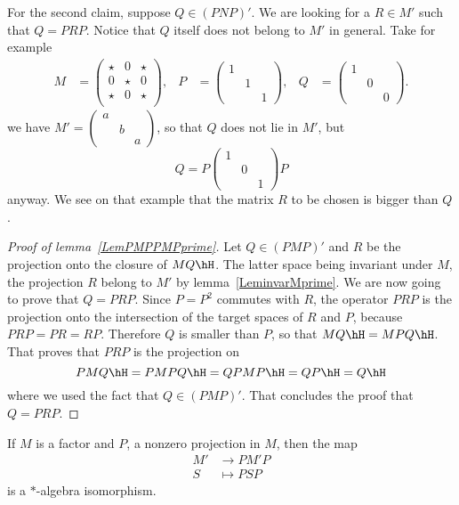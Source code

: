 For the second claim, suppose $Q\in(PNP)'$. We are looking for a $R\in M'$ such that $Q=PRP$. Notice that $Q$ itself does not belong to $M'$ in general. Take for example
\begin{align*}
	M & =\begin{pmatrix}
		     \star & 0     & \star \\
		     0     & \star & 0     \\
		     \star & 0     & \star \\
	     \end{pmatrix},
	  &
	P & =\begin{pmatrix}
		     1        \\
		      & 1     \\
		      &   & 1
	     \end{pmatrix},
	  &
	Q & =\begin{pmatrix}
		     1        \\
		      & 0     \\
		      &   & 0
	     \end{pmatrix}.
\end{align*}
we have $M'=\begin{pmatrix}
		a        \\
		 & b     \\
		 &   & a
	\end{pmatrix}$, so that $Q$ does not lie in $M'$, but
\[
	Q=P\begin{pmatrix}
		1        \\
		 & 0     \\
		 &   & 1
	\end{pmatrix}P
\]
anyway. We see on that example that the matrix $R$ to be chosen is bigger than $Q$.

\begin{proof}[Proof of lemma~\ref{LemPMPPMPprime}]
	Let $Q\in (PMP)'$ and $R$ be the projection onto the closure of $MQ\hH$. The latter space being invariant under $M$, the projection $R$ belong to $M'$ by lemma~\ref{LeminvarMprime}. We are now going to prove that $Q=PRP$. Since $P=P^2$ commutes with $R$, the operator $PRP$ is the projection onto the intersection of the target spaces of $R$ and $P$, because $PRP=PR=RP$. Therefore $Q$ is smaller than $P$, so that $MQ\hH=MPQ\hH$. That proves that $PRP$ is the projection on
	\[
		PMQ\hH=PMPQ\hH=QPMP\hH=QP\hH=Q\hH
	\]
	where we used the fact that $Q\in(PMP)'$. That concludes the proof that $Q=PRP$.
\end{proof}

\begin{lemma}		\label{LemMapipsomPMmP}
	If $M$ is a factor and $P$, a nonzero projection in $M$, then the map
	\begin{equation}
		\begin{aligned}
			M' & \to PM'P    \\
			S  & \mapsto PSP
		\end{aligned}
	\end{equation}
	is a $*$-algebra isomorphism.
\end{lemma}

